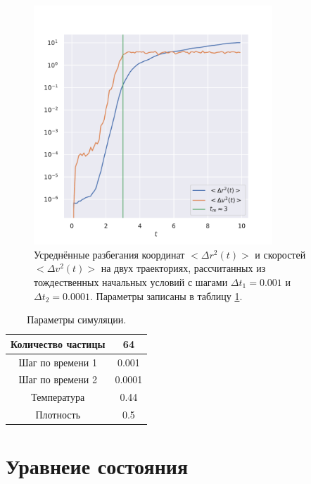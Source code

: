 \documentclass[a4paper,12pt]{report}
\begin{document}
\begin{figure}[H]
    \centering
    \includegraphics[width=0.8\textwidth]{../../media/tm.pdf}
    \caption{Усреднённые разбегания координат \(<\Delta r^2(t)>\) и скоростей \(<\Delta v^2(t)>\) на двух траекториях, рассчитанных из тождественных начальных условий с шагами \(\Delta t_1 = 0.001\) и \(\Delta t_2 = 0.0001\). Параметры записаны в таблицу \ref{tab1}.}
\end{figure}

\begin{table}[H]
    \centering
    \caption{Параметры симуляции.}
    \label{tab1}
    \begin{tabular}{| c | c |}
        \hline
        Количество частицы & 64 \\
        \hline
        Шаг по времени 1 & 0.001 \\
        \hline
        Шаг по времени 2 & 0.0001 \\
        \hline
        Температура & 0.44 \\
        \hline
        Плотность & 0.5 \\
        \hline
    \end{tabular}
\end{table}

\section{Уравнеие состояния}
\end{document}
